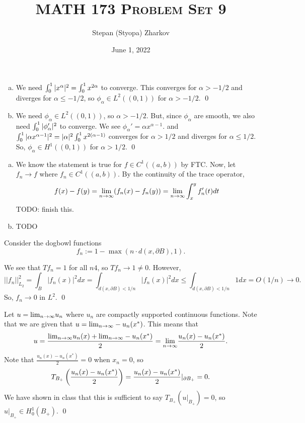 \documentclass{article}
\title{\textsc{MATH 173 Problem Set 9}}
\author{Stepan (Styopa) Zharkov}
\date{June 1, 2022}
\renewcommand{\d}{\partial}
\begin{document}
\maketitle
{} 
\tri
\hop 
\solution

\newpage
{} 
\tri
\hop 
\solution
\begin{enumerate}[(a)]
    \item We need $\int_0^1 |x^\alpha|^2 = \int_0^1 x^{2\alpha}$ to converge. This converges for $\alpha > -1/2$ and diverges for $\alpha \le -1/2$, so $\phi_\alpha \in L^2((0,1))$ for $\alpha > -1/2$. \qed
    \item We need $\phi_\alpha \in L^2((0,1))$, so $\alpha > -1/2$. But, since $\phi_\alpha$ are smooth, we also need $\int_0^1 |\phi_\alpha ' |^2$ to converge. We see $\phi_\alpha' = \alpha x^{\alpha-1}$. and $\int_0^1 |\alpha x^{\alpha-1}|^2 = |\alpha|^2\int_0^1 x^{2(\alpha-1)}$ converges for $\alpha > 1/2$ and diverges for $\alpha \le 1/2$. So, $\phi_\alpha \in H^1((0,1))$ for $\alpha > 1/2$. \qed
\end{enumerate}

\newpage
{} 
\tri
\hop 
\solution
\begin{enumerate}[(a)]
    \item We know the statement is true for $f \in C^1((a,b))$ by FTC. Now, let $f_n \to f$ where $f_n \in C^1((a,b))$. By the continuity of the trace operator, 
    \[f(x) - f(y) = {\lim_{n \to \infty}} (f_n(x)-f_n(y)) = {\lim_{n \to \infty}} \int_x^yf_n'(t)dt\]
    TODO: finish this.
    \item TODO
\end{enumerate}

\newpage
{} 
\tri
\hop 
\solution

\newpage
{} 
\tri
\hop 
\solution Consider the dogbowl functions 
\[f_n := 1-\max(n\cdot d(x, \d B), 1).\]


We see that $Tf_n = 1$ for all $n4$, so $Tf_n \to 1 \ne 0$. However, 
\[||f_n||_{L_2}^2 = \int_B |f_n(x)|^2dx = \int_{d(x,\d B)< 1/n} |f_n(x)|^2dx \le  \int_{d(x,\d B)< 1/n} 1 dx  = O(1/n) \to 0.\]
So, $f_n \to 0$ in $L^2$. \qed
 
\newpage
{} 
\tri
\hop 
\solution Let $u = {\lim_{n \to \infty}} u_n$ where $u_n$ are compactly supported continuous functions. Note that we are given that $u = {\lim_{n \to \infty}} -u_n(x^*)$. This means that 
\[u = \frac{ {\lim_{n \to \infty}} u_n(x) + {\lim_{n \to \infty}} -u_n(x^*)}{2}= {\lim_{n \to \infty}} \frac{u_n(x)-u_n(x^*)}{2}.\]
Note that $\frac{u_n(x)-u_n(x^*)}{2}= 0$ when $x_n =0$, so 
\[T_{B_+}\del{\frac{u_n(x)-u_n(x^*)}{2}} =\frac{u_n(x)-u_n(x^*)}{2}|_{\d B_+} = 0.\]
We have shown in class that this is sufficient to say $T_{B_+}(u|_{B_+}) = 0$, so $u|_{B_+}\in H_0^1(B_+)$. \qed

\newpage
{} 
\tri
\hop 
\solution
\end{document}
